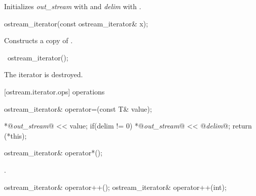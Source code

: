 \begin{itemdescr}
\pnum
\effects
Initializes \textit{out_stream} with  and \textit{delim} with .
\end{itemdescr}


%
\begin{itemdecl}
ostream_iterator(const ostream_iterator& x);
\end{itemdecl}

\begin{itemdescr}
\pnum
\effects
Constructs a copy of .
\end{itemdescr}

%
\begin{itemdecl}
~ostream_iterator();
\end{itemdecl}

\begin{itemdescr}
\pnum
\effects
The iterator is destroyed.
\end{itemdescr}

[ostream.iterator.ops]{ operations}

%
%
\begin{itemdecl}
ostream_iterator& operator=(const T& value);
\end{itemdecl}

\begin{itemdescr}
\pnum
\effects
\begin{codeblock}
*@\textit{out_stream}@ << value;
if(delim != 0)
  *@\textit{out_stream}@ << @\textit{delim}@;
return (*this);
\end{codeblock}
\end{itemdescr}

%
%
\begin{itemdecl}
ostream_iterator& operator*();
\end{itemdecl}

\begin{itemdescr}
\pnum
\returns
{}.
\end{itemdescr}

%
%
\begin{itemdecl}
ostream_iterator& operator++();
ostream_iterator& operator++(int);
\end{itemdecl}

